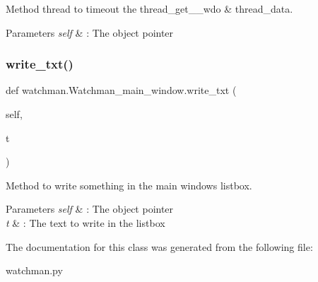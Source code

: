 Method thread to timeout the thread\+\_\+get\+\_\+\_\+wdo \& thread\+\_\+data. 


\begin{DoxyParams}{Parameters}
{\em self} & \+: The object pointer \\
\hline
\end{DoxyParams}
\mbox{\label{classwatchman_1_1_watchman__main__window_a9d3d9649b92b0e4098ba66205b4baf83}} 
\subsubsection{\texorpdfstring{write\_txt()}{write\_txt()}}
{\footnotesize\ttfamily def watchman.\+Watchman\+\_\+main\+\_\+window.\+write\+\_\+txt (\begin{DoxyParamCaption}\item[{}]{self,  }\item[{}]{t }\end{DoxyParamCaption})}



Method to write something in the main window\textquotesingle{}s listbox. 


\begin{DoxyParams}{Parameters}
{\em self} & \+: The object pointer \\
\hline
{\em t} & \+: The text to write in the listbox \\
\hline
\end{DoxyParams}


The documentation for this class was generated from the following file\+:\begin{DoxyCompactItemize}
\item 
watchman.\+py\end{DoxyCompactItemize}
